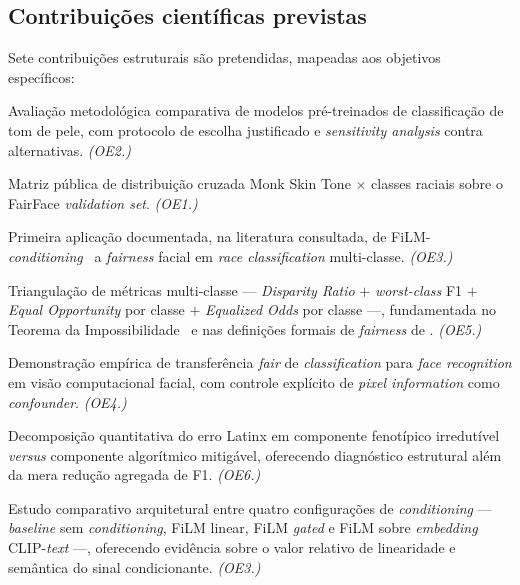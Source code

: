 \subsection{Contribuições científicas previstas}
\label{sec:contribuicoes}

Sete contribuições estruturais são pretendidas, mapeadas aos objetivos específicos:

\begin{description}[font=\bfseries\sffamily]
\item[C1.] Avaliação metodológica comparativa de modelos pré-treinados de classificação de tom de pele, com protocolo de escolha justificado e \emph{sensitivity analysis} contra alternativas. \textit{(OE2.)}
\item[C2.] Matriz pública de distribuição cruzada Monk Skin Tone $\times$ classes raciais sobre o FairFace \emph{validation set}. \textit{(OE1.)}
\item[C3.] Primeira aplicação documentada, na literatura consultada, de FiLM-\emph{conditioning}~\cite{perez2018film} a \emph{fairness} facial em \emph{race classification} multi-classe. \textit{(OE3.)}
\item[C4.] Triangulação de métricas multi-classe --- \emph{Disparity Ratio} $+$ \emph{worst-class} F1 $+$ \emph{Equal Opportunity} por classe $+$ \emph{Equalized Odds} por classe ---, fundamentada no Teorema da Impossibilidade~\cite{kleinberg2017inherent} e nas definições formais de \emph{fairness} de . \textit{(OE5.)}
\item[C5.] Demonstração empírica de transferência \emph{fair} de \emph{classification} para \emph{face recognition} em visão computacional facial, com controle explícito de \emph{pixel information} como \emph{confounder}. \textit{(OE4.)}
\item[C6.] Decomposição quantitativa do erro Latinx em componente fenotípico irredutível \emph{versus} componente algorítmico mitigável, oferecendo diagnóstico estrutural além da mera redução agregada de F1. \textit{(OE6.)}
\item[C7.] Estudo comparativo arquitetural entre quatro configurações de \emph{conditioning} --- \emph{baseline} sem \emph{conditioning}, FiLM linear, FiLM \emph{gated} e FiLM sobre \emph{embedding} CLIP-\emph{text} ---, oferecendo evidência sobre o valor relativo de linearidade e semântica do sinal condicionante. \textit{(OE3.)}
\end{description}
